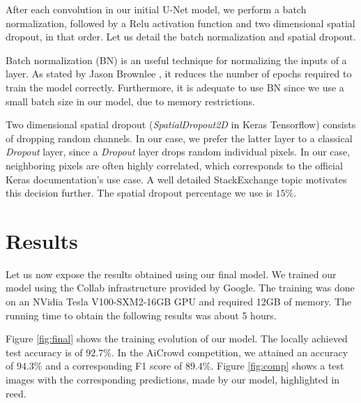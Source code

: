 \documentclass[10pt,conference,compsocconf]{IEEEtran}
\begin{document}
After each convolution in our initial U-Net model, we perform a batch normalization, followed by a Relu activation function and two dimensional spatial dropout, in that order. Let us detail the batch normalization and spatial dropout.

Batch normalization (BN) is an useful technique for normalizing the inputs of a layer. As stated by Jason Brownlee \cite{bn}, it reduces the number of epochs required to train the model correctly. Furthermore, it is adequate to use BN since we use a small batch size in our model, due to memory restrictions.

Two dimensional spatial dropout (\textit{SpatialDropout2D} in Keras Tensorflow) consists of dropping random channels. In our case, we prefer the latter layer to a classical \textit{Dropout} layer, since a \textit{Dropout} layer drops random individual pixels. In our case, neighboring pixels are often highly correlated, which corresponds to the official Keras documentation's \cite{keras} use case. A well detailed StackExchange topic \cite{stack} motivates this decision further. The spatial dropout percentage we use is $15\%$.


\section{Results}
\label{sec:results}

Let us now expose the results obtained using our final model. We trained our model using the Collab infrastructure provided by Google. The training was done on an NVidia Tesla V100-SXM2-16GB GPU and required 12GB of memory. The running time to obtain the following results was about 5 hours.

Figure \ref{fig:final} shows the training evolution of our model. The locally achieved test accuracy is of $92.7\%$. In the AiCrowd competition, we attained an accuracy of $94.3\%$ and a corresponding F1 score of $89.4\%$. Figure \ref{fig:comp} shows a test images with the corresponding predictions, made by our model, highlighted in reed.
\end{document}
